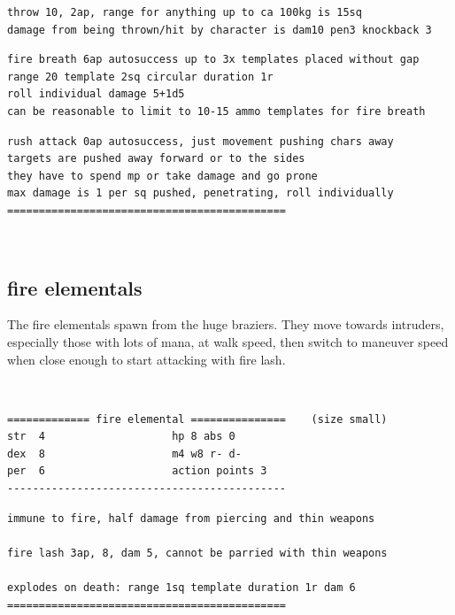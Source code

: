 \begin{samepage}
\begin{verbatim}
\end{verbatim} \goodbreak \begin{verbatim}
throw 10, 2ap, range for anything up to ca 100kg is 15sq
damage from being thrown/hit by character is dam10 pen3 knockback 3

\end{verbatim} \goodbreak \begin{verbatim}
fire breath 6ap autosuccess up to 3x templates placed without gap
range 20 template 2sq circular duration 1r
roll individual damage 5+1d5
can be reasonable to limit to 10-15 ammo templates for fire breath

\end{verbatim} \goodbreak \begin{verbatim}
rush attack 0ap autosuccess, just movement pushing chars away
targets are pushed away forward or to the sides
they have to spend mp or take damage and go prone
max damage is 1 per sq pushed, penetrating, roll individually
============================================
\end{verbatim} \end{samepage} \normalsize

\


\goodbreak 
\subsection*{fire elementals}

The fire elementals spawn from the huge braziers. They move towards intruders, especially those with lots of mana, at walk speed, then switch to maneuver speed when close enough to start attacking with fire lash.

\

\small \begin{samepage} \begin{verbatim}
============= fire elemental ===============    (size small)
str  4                    hp 8 abs 0
dex  8                    m4 w8 r- d-
per  6                    action points 3
--------------------------------------------
\end{verbatim} \goodbreak \begin{verbatim}
immune to fire, half damage from piercing and thin weapons

fire lash 3ap, 8, dam 5, cannot be parried with thin weapons

explodes on death: range 1sq template duration 1r dam 6
============================================
\end{verbatim} \end{samepage} \normalsize


